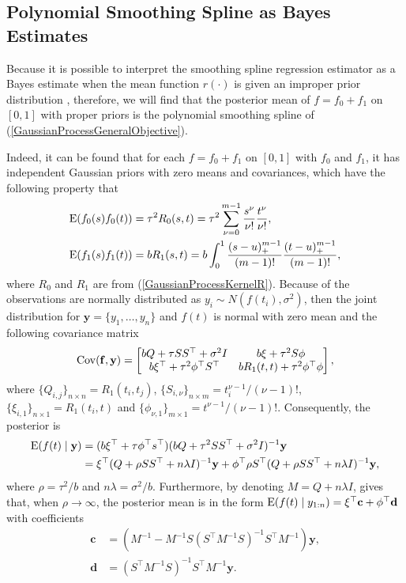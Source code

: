 \subsection{Polynomial Smoothing Spline as Bayes Estimates}

Because it is possible to interpret the smoothing spline regression estimator as a Bayes estimate when the mean function $r(\cdot)$ is given an improper prior distribution \cite{wahba1990spline} \cite{berlinet2011reproducing}, therefore, we will find that the posterior mean of $f=f_0+f_1$ on $[0,1]$ with proper priors is the polynomial smoothing  spline of (\ref{GaussianProcessGeneralObjective}). 

Indeed, it can be found that for each $f=f_0+f_1$ on $[0,1]$ with $f_0$ and $f_1$, it has independent Gaussian priors with zero means and covariances, which have the following property that 
\begin{align*}
\mathrm{E} (f_0(s)f_0(t)) &= \tau^2 R_0(s,t)=\tau^2 \sum_{\nu=0}^{m-1}\frac{s^\nu}{\nu!}\frac{t^\nu}{\nu!}, \\
\mathrm{E} (f_1(s)f_1(t)) &= bR_1(s,t) = b\int_{0}^{1} \frac{(s-u)_+^{m-1}}{(m-1)!} \frac{(t-u)_+^{m-1}}{(m-1)!},
\end{align*}
where $R_0$ and $R_1$ are from (\ref{GaussianProcessKernelR}). Because of the observations are normally distributed as $y_i\sim N(f(t_i),\sigma^2)$, then the joint distribution for $\mathbf{y} = \{y_1,\ldots,y_n\}$ and $f(t)$ is normal with zero mean and the following covariance matrix 
\begin{align*}\mathrm{Cov} (\mathbf{f},\mathbf{y}) = 
\begin{bmatrix}
bQ+\tau SS^\top+\sigma^2 I & b\xi +\tau^2 S\phi \\
b\xi^\top + \tau^2\phi^\top S^\top & bR_1(t,t) +\tau^2\phi^\top \phi
\end{bmatrix},
\end{align*}
where $\{Q_{i,j}\}_{n\times n}=R_1(t_i,t_j)$, $\{S_{i,\nu}\}_{n\times m}=t_i^{\nu-1}/(\nu-1)!$, $\{\xi_{i,1}\}_{n\times 1}=R_1(t_i,t)$ and $\{\phi_{\nu,1}\}_{m\times 1}=t^{\nu-1}/(\nu-1)!$. 
Consequently, the posterior is 
\begin{equation}
\begin{split}
\mathrm{E} (f(t)\mid\mathbf{y}) &= (b\xi^\top +\tau \phi^\top s^\top)(bQ+\tau^2 SS^\top+\sigma^2I)^{-1}\mathbf{y} \\
&= \xi^\top(Q+\rho SS^\top+n\lambda I)^{-1}\mathbf{y}+ \phi^\top\rho S^\top(Q+\rho SS^\top +n\lambda I)^{-1}\mathbf{y},
\end{split}
\end{equation}
where $\rho = \tau^2/b$ and $n\lambda=\sigma^2/b$. Furthermore, by denoting $M=Q+n\lambda I$, \cite{gu2013smoothing} gives that, when $\rho\rightarrow \infty$, the posterior mean is in the form $\mathrm{E}(f(t)\mid y_{1:n}) = \xi^\top\mathbf{c}+\phi^\top\mathbf{d}$ with coefficients
\begin{align}
\mathbf{c}&=(M^{-1}-M^{-1}S(S^\top M^{-1}S)^{-1}S^\top M^{-1})\mathbf{y},\\
\mathbf{d}&=(S^\top M^{-1}S)^{-1}S^\top M^{-1}\mathbf{y}.
\end{align}

